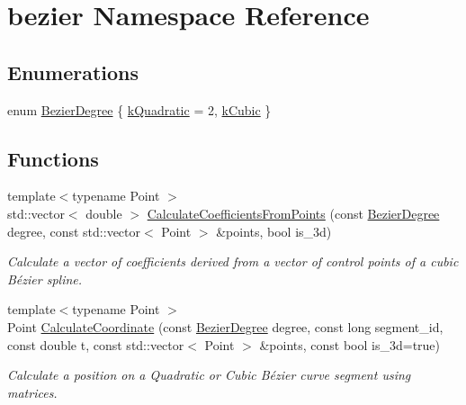 \hypertarget{namespacebezier}{}\section{bezier Namespace Reference}
\label{namespacebezier}
\subsection*{Enumerations}
\begin{DoxyCompactItemize}
\item 
enum \hyperlink{namespacebezier_a175e919883bf10c186c78e5e4aed6a7d}{Bezier\+Degree} \{ \hyperlink{namespacebezier_a175e919883bf10c186c78e5e4aed6a7da44e0a040e2a5f67793a24917160df878}{k\+Quadratic} = 2, 
\hyperlink{namespacebezier_a175e919883bf10c186c78e5e4aed6a7da74da9ce3503d5713c23731eeedd3804f}{k\+Cubic}
 \}
\end{DoxyCompactItemize}
\subsection*{Functions}
\begin{DoxyCompactItemize}
\item 
{\footnotesize template$<$typename Point $>$ }\\std\+::vector$<$ double $>$ \hyperlink{namespacebezier_a4bbd6c4f88a535db34d1e58e26d8b515}{Calculate\+Coefficients\+From\+Points} (const \hyperlink{namespacebezier_a175e919883bf10c186c78e5e4aed6a7d}{Bezier\+Degree} degree, const std\+::vector$<$ Point $>$ \&points, bool is\+\_\+3d)
\begin{DoxyCompactList}\small\item\em Calculate a vector of coefficients derived from a vector of control points of a cubic Bézier spline. \end{DoxyCompactList}\item 
{\footnotesize template$<$typename Point $>$ }\\Point \hyperlink{namespacebezier_af793f35d54ec372d8bf3d65801e839ae}{Calculate\+Coordinate} (const \hyperlink{namespacebezier_a175e919883bf10c186c78e5e4aed6a7d}{Bezier\+Degree} degree, const long segment\+\_\+id, const double t, const std\+::vector$<$ Point $>$ \&points, const bool is\+\_\+3d=true)
\begin{DoxyCompactList}\small\item\em Calculate a position on a Quadratic or Cubic Bézier curve segment using matrices. \end{DoxyCompactList}\end{DoxyCompactItemize}



